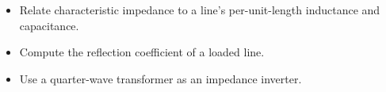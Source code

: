 \begin{objectives}
\begin{itemize}[leftmargin=1.4em,itemsep=2pt]
\item Relate characteristic impedance to a line's per-unit-length inductance and capacitance.
\item Compute the reflection coefficient of a loaded line.
\item Use a quarter-wave transformer as an impedance inverter.
\end{itemize}
\end{objectives}
